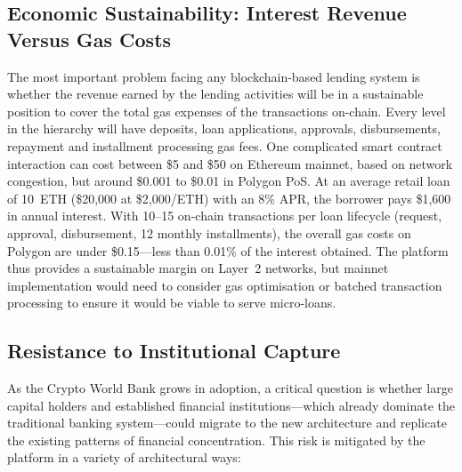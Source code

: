 \documentclass[12pt,a4paper]{report}
\begin{document}
\subsection{Economic Sustainability: Interest Revenue Versus Gas Costs}

The most important problem facing any blockchain-based lending system is whether the revenue earned by the lending activities will be in a sustainable position to cover the total gas expenses of the transactions on-chain. Every level in the hierarchy will have deposits, loan applications, approvals, disbursements, repayment and installment processing gas fees. One complicated smart contract interaction can cost between \$5 and \$50 on Ethereum mainnet, based on network congestion, but around \$0.001 to \$0.01 in Polygon PoS. At an average retail loan of 10~ETH (\$20,000 at \$2,000/ETH) with an 8\% APR, the borrower pays \$1,600 in annual interest. With 10--15 on-chain transactions per loan lifecycle (request, approval, disbursement, 12 monthly installments), the overall gas costs on Polygon are under \$0.15---less than 0.01\% of the interest obtained. The platform thus provides a sustainable margin on Layer~2 networks, but mainnet implementation would need to consider gas optimisation or batched transaction processing to ensure it would be viable to serve micro-loans.

\subsection{Resistance to Institutional Capture}

As the Crypto World Bank grows in adoption, a critical question is whether large capital holders and established financial institutions---which already dominate the traditional banking system---could migrate to the new architecture and replicate the existing patterns of financial concentration. This risk is mitigated by the platform in a variety of architectural ways:
\end{document}
